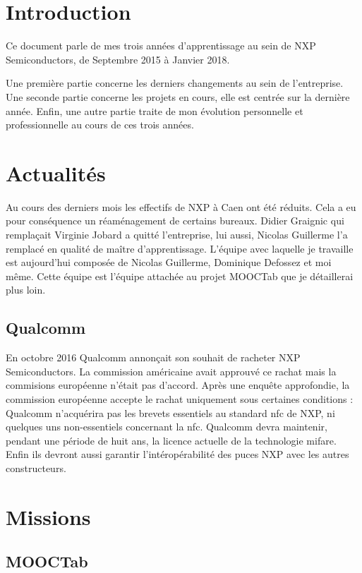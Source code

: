\documentclass[french,12pt,a4paper,titlepage,openright,openbib]{report}
\begin{document}
\chapter{Introduction}

Ce document parle de mes trois années d'apprentissage au sein de NXP Semiconductors, de Septembre 2015 à Janvier 2018.

Une première partie concerne les derniers changements au sein de l'entreprise.
Une seconde partie concerne les projets en cours, elle est centrée sur la dernière année.
Enfin, une autre partie traite de mon évolution personnelle et professionnelle au cours de ces trois années.

\chapter{Actualités}

Au cours des derniers mois les effectifs de NXP à Caen ont été réduits. Cela a eu pour conséquence un réaménagement de certains bureaux.
Didier Graignic qui remplaçait Virginie Jobard a quitté l'entreprise, lui aussi, Nicolas Guillerme l'a remplacé en qualité de maître d'apprentissage.
L'équipe avec laquelle je travaille est aujourd'hui composée de Nicolas Guillerme, Dominique Defossez et moi même. Cette équipe est l'équipe attachée au projet MOOCTab que je détaillerai plus loin.


\section{Qualcomm}

En octobre 2016 Qualcomm annonçait son souhait de racheter NXP Semiconductors. La commission américaine avait approuvé ce rachat mais la commisions européenne n'était pas d'accord. Après une enquête approfondie, la commission européenne accepte le rachat uniquement sous certaines conditions :
Qualcomm n'acquérira pas les brevets essentiels au standard \gls{nfc} de NXP, ni quelques uns non-essentiels concernant la \gls{nfc}.
Qualcomm devra maintenir, pendant une période de huit ans, la licence actuelle de la technologie \gls{mifare}. Enfin ils devront aussi garantir l'intéropérabilité des puces NXP avec les autres constructeurs.

\chapter{Missions}
\lipsum[1-1]
\section{MOOCTab}
\lipsum[2-3]
\end{document}
